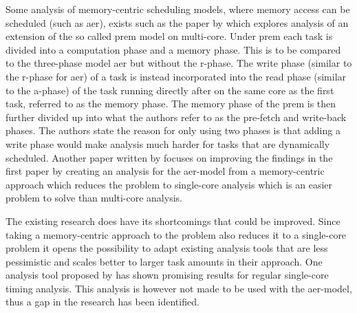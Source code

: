 \documentclass{kththesis}
\begin{document}

Some analysis of memory-centric scheduling models, where memory access can be scheduled (such as
\acrshort{aer}), exists such as the paper by \textcite{alhammad_schedulability_2014} which explores
analysis of an extension of the so called \acrshort{prem} model on multi-core. Under \acrshort{prem}
each task is divided into a computation phase and a memory phase. This is to be compared to the
three-phase model \acrshort{aer} but without the \acrshort{r}-phase. The write phase (similar to the
\acrshort{r}-phase for \acrshort{aer}) of a task is instead incorporated into the read phase
(similar to the \acrshort{a}-phase) of the task running directly after on the same core as the first
task, referred to as the memory phase. The memory phase of the \acrshort{prem} is then further
divided up into what the authors refer to as the pre-fetch and write-back phases. The authors state
the reason for only using two phases is that adding a write phase would make analysis much harder
for tasks that are dynamically scheduled. Another paper written by
\textcite{maia_schedulability_2017} focuses on improving the findings in the first paper by creating
an analysis for the \acrshort{aer}-model from a memory-centric approach which reduces the problem to
single-core analysis which is an easier problem to solve than multi-core analysis.


The existing research does have its shortcomings that could be improved. Since taking a
memory-centric approach to the problem also reduces it to a single-core problem it opens the
possibility to adapt existing analysis tools that are less pessimistic and scales better to larger
task amounts in their approach. One analysis tool proposed by \textcite{nasri_exact_2017} has shown
promising results for regular single-core timing analysis. This analysis is however not
made to be used with the \acrshort{aer}-model, thus a gap in the research has been identified.


\end{document}
